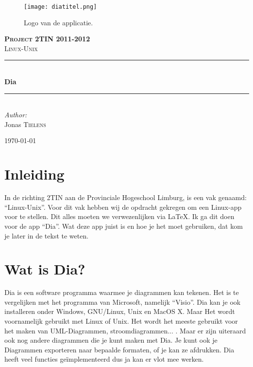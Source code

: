 \documentclass[11pt]{article}
\newcommand{\HRule}{\rule{\linewidth}{0.5mm}}
\begin{document}
\begin{titlepage}
 
\begin{center}
 

\begin{figure}
\texttt{[image: diatitel.png]}  
\caption [Logo]{Logo van de applicatie.}
\end{figure}   
 
\textsc{\LARGE \bf Project 2TIN 2011-2012}\\[1.5cm]
 
\textsc{\Large Linux-Unix}\\[0.5cm]
 

 \HRule \\[0.4cm]
 { \huge \bf Dia}
 
\HRule \\[1.5cm]
 

 \emph{Author:}\\
 Jonas \textsc{Tielens}
 

 
\vfill
 
 {\large \today}
 
\end{center}
 
\end{titlepage}

\newpage
\tableofcontents
\newpage

\section {Inleiding}
In de richting 2TIN aan de Provinciale Hogeschool Limburg, is een vak genaamd: “Linux-Unix”. Voor dit vak hebben wij de opdracht gekregen om een Linux-app voor te stellen. Dit alles moeten we verwezenlijken via LaTeX. Ik ga dit doen voor de app “Dia”. Wat deze app juist is en hoe je het moet gebruiken, dat kom je later in de tekst te weten.

\section {Wat is Dia?}
Dia is een software programma waarmee je diagrammen kan tekenen. Het is te vergelijken met het programma van Microsoft, namelijk “Visio”. Dia kan je ook installeren onder Windows, GNU/Linux, Unix en MacOS X. Maar Het wordt voornamelijk gebruikt met Linux of Unix. Het wordt het meeste gebruikt voor het maken van UML-Diagrammen, stroomdiagrammen... . Maar er zijn uiteraard ook nog andere diagrammen die je kunt maken met Dia. Je kunt ook je Diagrammen exporteren naar bepaalde formaten, of je kan ze afdrukken. Dia heeft veel functies geïmplementeerd dus ja kan er vlot mee werken.
\end{document}
